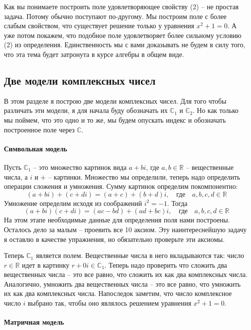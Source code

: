 Как вы понимаете построить поле удовлетворяющее свойству (2) -- не простая задача.
Потому обычно поступают по-другому.
Мы построим поле с более слабым свойством, что существует решение только у уравнения $x^2 + 1 = 0$.
А уже потом покажем, что подобное поле удовлетворяет более сильному условию (2) из определения.
Единственность мы с вами доказывать не будем в силу того, что эта тема будет затронута в курсе алгебры в общем виде.

\subsection{Две модели комплексных чисел}
\label{subsection::ComplexModels}

В этом разделе я построю две модели комплексных чисел.
Для того чтобы различать эти модели, я для начала буду обозначать их $\mathbb C_1$ и $\mathbb C_2$.
Но как только мы поймем, что это одно и то же, мы будем опускать индекс и обозначать построенное поле через $\mathbb C$.

\paragraph{Символьная модель}

Пусть $\mathbb C_1$ -- это множество картинок вида $a+bi$, где $a,b\in\mathbb R$ -- вещественные числа, а $i$ и $+$ -- картинки.
Множество мы определили, теперь надо определить операции сложения и умножения.
Сумму картинок определим покомпонентно:
\[
(a+bi) + (c+di) = (a+c) + (b+d) i, \quad\text{где}\quad a,b,c,d\in\mathbb R
\]
Умножение определим исходя из соображений $i^2 = -1$.
Тогда
\[
(a+bi)(c+di) = (ac - bd) + (ad + bc)i,\quad\text{где}\quad a,b,c,d\in\mathbb R
\]
На этом этапе необходимые данные для определения поля нами построены.
Осталось дело за малым -- проевить все 10 аксиом.
Эту наинтереснейшую задачу я оставлю в качестве упражнения, но обязательно проверьте эти аксиомы.

Теперь $\mathbb C_1$ является полем.
Вещественные числа в него вкладываются так: число $r\in\mathbb R$ идет в картинку $r + 0 i\in\mathbb C_1$.
Теперь надо проверить что сложить два вещественных числа -- это все равно, что сложить их как два комплексных числа.
Аналогично, умножить два вещественных числа -- это все равно, что умножить их как два комплексных числа.
Напоследок заметим, что число комплексное число $i$ выбрано так, чтобы оно являлось решением уравнения $x^2 + 1 = 0$.

\paragraph{Матричная модель}

